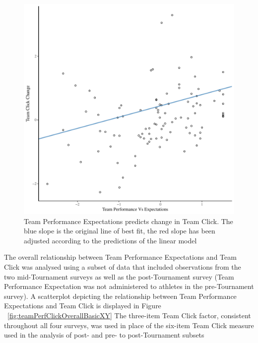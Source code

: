 \begin{landscape}

    
    


    \begin{figure}[htbp]
    \includegraphics[width = \linewidth]{images/teamPerfClickDeltaModelSlope.pdf}
      \caption{Team Performance Expectations predicts change in Team Click. The blue slope is the original line of best fit, the red slope has been adjusted according to the predictions of the linear model}
      \label{fig:teamPerfClickDeltaModelSlope}
    \end{figure}




The overall relationship between Team Performance Expectations and Team Click was analysed using a subset of data that included observations from the two mid-Tournament surveys as well as the post-Tournament survey (Team Performance Expectation was not administered to athletes in the pre-Tournament survey).  A scatterplot depicting the relationship between Team Performance Expectations and Team Click is displayed in Figure ~\ref{fig:teamPerfClickOverallBasicXY} The three-item Team Click factor, consistent throughout all four surveys, was used in place of the six-item Team Click measure used in the analysis of post- and pre- to post-Tournament subsets


\end{landscape}
